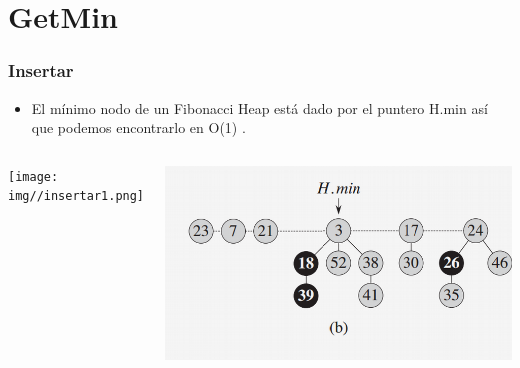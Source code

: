 \documentclass{beamer}
\begin{document}
\section{GetMin}
\begin{frame}
  \frametitle{Insertar}
  \begin{itemize}
    \item El mínimo nodo de un Fibonacci Heap está dado por el puntero H.min así que podemos encontrarlo en O(1) . 
  \end{itemize}

  
  \begin{columns}[t]
    \texttt{[image: img//insertar1.png]}
      
    \includegraphics[width =1 \textwidth]{imagenes/insertar2.png}

   \end{columns}

\end{frame}
  
\end{document}
